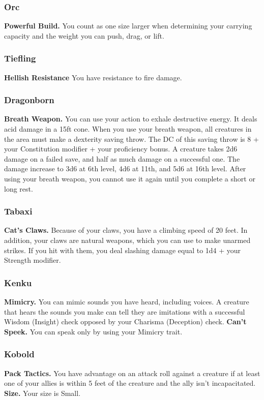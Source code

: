 \documentclass[a4paper,10pt,twoside,twocolumn]{dndbook} %
\begin{document}
	\subsubsection{Orc}
	\textbf{Powerful Build.} You count as one size larger when determining your carrying capacity and the weight you can push, drag, or lift.
	\subsubsection{Tiefling}
	\textbf{Hellish Resistance} You have resistance to fire damage.
	\subsubsection{Dragonborn}
	\textbf{Breath Weapon.} You can use your action to exhale destructive energy. It deals acid damage in a 15ft cone. When you use your breath weapon, all creatures in the area must make a dexterity saving throw. The DC of this saving throw is 8 + your Constitution modifier + your proficiency bonus. A creature takes 2d6 damage on a failed save, and half as much damage on a successful one. The damage increase to 3d6 at 6th level, 4d6 at 11th, and 5d6 at 16th level. After using your breath weapon, you cannot use it again until you complete a short or long rest.
	\subsubsection{Tabaxi}
	\textbf{Cat's Claws.} Because of your claws, you have a climbing speed of 20 feet. In addition, your claws are natural weapons, which you can use to make unarmed strikes. If you hit with them, you deal slashing damage equal to 1d4 + your Strength modifier.
	\subsubsection{Kenku}
	\textbf{Mimicry.} You can mimic sounds you have heard, including voices. A creature that hears the sounds you make can tell they are imitations with a successful Wisdom (Insight) check opposed by your Charisma (Deception) check.\linebreak
	\textbf{Can't Speek.} You can speak only by using your Mimicry trait.
	\subsubsection{Kobold}
	\textbf{Pack Tactics.} You have advantage on an attack roll against a creature if at least one of your allies is within 5 feet of the creature and the ally isn't incapacitated.\linebreak
	\textbf{Size.} Your size is Small.
\end{document}
